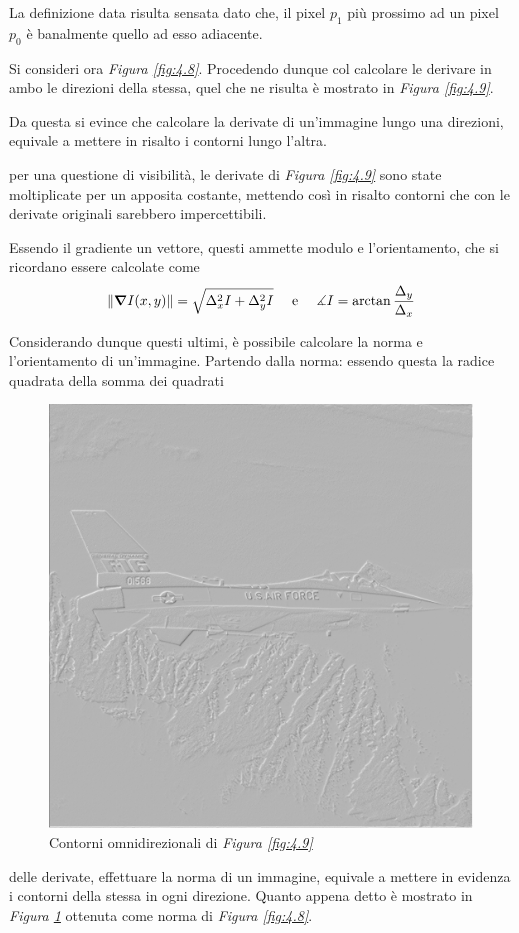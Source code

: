 \documentclass{subfiles}
\begin{document}
La definizione data risulta sensata dato che, il pixel \(p_{1}\) più prossimo ad un pixel \(p_{0}\) è banalmente quello ad esso adiacente.

Si consideri ora \emph{Figura \ref{fig:4.8}}. Procedendo dunque col calcolare le derivare in ambo le direzioni della stessa,
quel che ne risulta è mostrato in \emph{Figura \ref{fig:4.9}}.

Da questa si evince che calcolare la derivate di un'immagine lungo una direzioni, equivale a mettere in risalto i contorni lungo l'altra.

\begin{Remark*}
    per una questione di visibilità, le derivate di \emph{Figura \ref{fig:4.9}} sono state moltiplicate per un apposita costante,
    mettendo così in risalto contorni che con le derivate originali sarebbero impercettibili.
\end{Remark*}

Essendo il gradiente un vettore, questi ammette modulo e l'orientamento, che si ricordano essere calcolate come
\[
    \norm{\grad{I(x,y)}} = \sqrt{\Delta_{x}^{2}I + \Delta_{y}^{2}I} \quad \text{e} \quad \measuredangle I = \arctan \frac{\Delta_{y}}{\Delta_{x}}
\]

Considerando dunque questi ultimi, è possibile calcolare la norma e l'orientamento di un'immagine.
Partendo dalla norma: essendo questa la radice quadrata della somma dei quadrati
\begin{figure}
    \centering
    \includegraphics[scale = 0.325]{../Images/Airplane/ModulesAirplane.png}
    \caption{Contorni  omnidirezionali di \emph{Figura \ref{fig:4.9}}}
    \label{fig:4.10}
\end{figure}
delle derivate, effettuare la norma di un immagine, equivale a mettere in evidenza i contorni della stessa in ogni direzione.
Quanto appena detto è mostrato in \emph{Figura \ref{fig:4.10}} ottenuta come norma di \emph{Figura \ref{fig:4.8}}.
\end{document}
